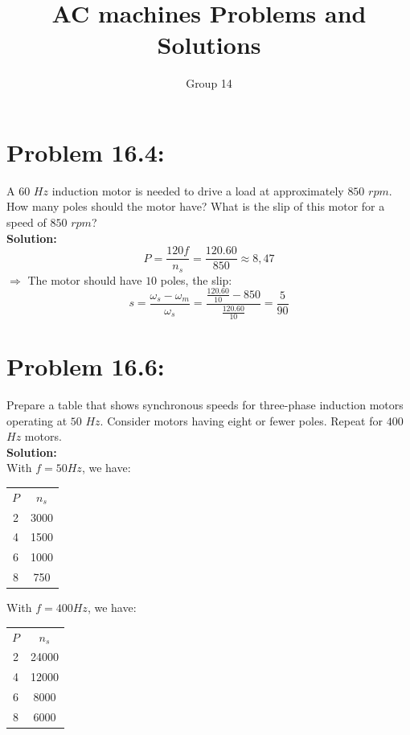 \documentclass[9pt]{extarticle}
\title{AC machines Problems and Solutions}
\author{Group 14}
\begin{document}
\maketitle
\section*{Problem 16.4:} A $60$ $Hz$ induction motor is needed to drive 
a load at approximately $850$ $rpm$. How many 
poles should the motor have? What is the 
slip of this motor for a speed of $850$ $rpm$?
\\ \textbf{Solution:}
$$P=\frac{120f}{n_{s}}=\frac{120.60}{850}\approx8,47$$
$\Rightarrow$ The motor should have $10$ poles, the slip:
$$s=\frac{\omega_{s}-\omega_{m}}{\omega_{s}}=\frac{\frac{120.60}{10}-850}{\frac{120.60}{10}}=\frac{5}{90}$$
\section*{Problem 16.6:}
Prepare a table that shows synchronous 
speeds for three-phase induction motors 
operating at $50$ $Hz$. Consider motors having 
eight or fewer poles. Repeat for $400$ $Hz$ 
motors.
\\ \textbf{Solution:}
\\With $f=50 Hz$, we have:
\begin{center}
   \begin{tabular}{ c | c}
    $P$ & $n_{s}$  \\ 
    2 & 3000  \\  
    4 & 1500\\
    6 & 1000\\
    8 & 750\\
   \end{tabular}
   \end{center}
With $f=400 Hz$, we have:
   \begin{center}
      \begin{tabular}{ c | c}
       $P$ & $n_{s}$  \\ 
       2 & 24000  \\  
       4 & 12000\\
       6 & 8000\\
       8 & 6000\\
      \end{tabular}
      \end{center}
\end{document}
